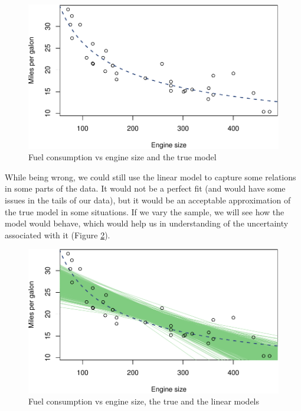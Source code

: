 \documentclass[
]{book}
\theoremstyle{definition}
\theoremstyle{definition}
\theoremstyle{definition}
\theoremstyle{definition}
\theoremstyle{remark}
\begin{document}
\begin{figure}
\centering
\includegraphics{Svetunkov---Statistics-for-Business-Analytics_files/figure-latex/biasVariance02-1.pdf}
\caption{\label{fig:biasVariance02}Fuel consumption vs engine size and the true model}
\end{figure}

While being wrong, we could still use the linear model to capture some relations in some parts of the data. It would not be a perfect fit (and would have some issues in the tails of our data), but it would be an acceptable approximation of the true model in some situations. If we vary the sample, we will see how the model would behave, which would help us in understanding of the uncertainty associated with it (Figure \ref{fig:biasVariance03}).

\begin{figure}
\centering
\includegraphics{Svetunkov---Statistics-for-Business-Analytics_files/figure-latex/biasVariance03-1.pdf}
\caption{\label{fig:biasVariance03}Fuel consumption vs engine size, the true and the linear models}
\end{figure}
\end{document}
